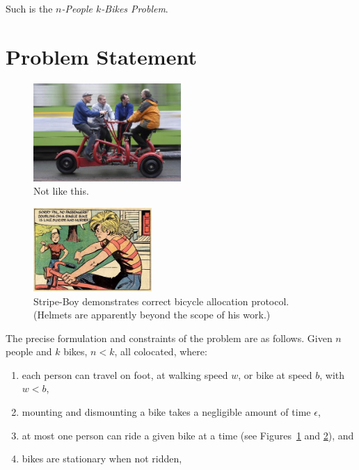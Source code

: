 \documentclass[DIV=calc, paper=a4, fontsize=11pt, twocolumn]{scrartcl}	 %
\newcommand{\initial}[1]{ %
\lettrine[lines=3,lhang=0.3,nindent=0em]{
\color{DarkGoldenrod}
{\textsf{#1}}}{}}
\newcommand\prob{$n$-People $k$-Bikes Problem}
\begin{document}
Such is the {\em \prob}.

\section{Problem Statement}

\begin{figure}[h]
	\begin{center}
	\includegraphics[width=0.5\textwidth]{conference.jpg}
	\end{center}
	\caption{Not like this.}
	\label{fig:conference}
\end{figure}
\begin{figure}[h]
	\begin{center}
	\includegraphics[width=0.4\textwidth]{suicideandmurder.jpg}
	\end{center}
	\caption{Stripe-Boy demonstrates correct bicycle allocation protocol. (Helmets are apparently beyond the scope of his work.)}
	\label{fig:stripey}
\end{figure}

{T}he precise formulation and constraints of the problem are as follows.
\initial{G}iven $n$ people and $k$ bikes, $n<k$, all colocated, where:
\begin{enumerate}
	\setlength{\itemsep}{-0.5em}
	\item each person can travel on foot, at walking speed $w$, or bike at speed $b$, with $w<b$,
	\item mounting and dismounting a bike takes a negligible amount of time $\epsilon$,
	\item at most one person can ride a given bike at a time (see Figures~\ref{fig:conference} and \ref{fig:stripey}), and
	\item bikes are stationary when not ridden,
\end{enumerate}
\end{document}

